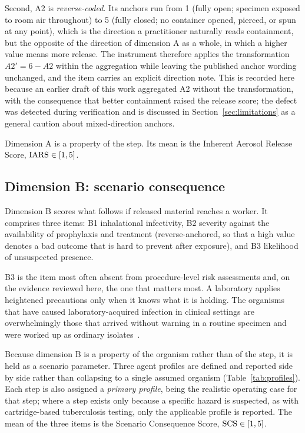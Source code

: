Second, A2 is \emph{reverse-coded}. Its anchors run from 1 (fully open; specimen exposed
to room air throughout) to 5 (fully closed; no container opened, pierced, or spun at any
point), which is the direction a practitioner naturally reads containment, but the
opposite of the direction of dimension A as a whole, in which a higher value means more
release. The instrument therefore applies the transformation $A2' = 6 - A2$ within the
aggregation while leaving the published anchor wording unchanged, and the item carries an
explicit direction note. This is recorded here because an earlier draft of this work
aggregated A2 without the transformation, with the consequence that better containment
raised the release score; the defect was detected during verification and is discussed in
Section~\ref{sec:limitations} as a general caution about mixed-direction anchors.

Dimension A is a property of the step. Its mean is the Inherent Aerosol Release Score,
$\textrm{IARS} \in [1,5]$.

\subsection{Dimension B: scenario consequence}

Dimension B scores what follows if released material reaches a worker. It comprises three
items: B1 inhalational infectivity, B2 severity against the availability of prophylaxis
and treatment (reverse-anchored, so that a high value denotes a bad outcome that is hard
to prevent after exposure), and B3 likelihood of unsuspected presence.

B3 is the item most often absent from procedure-level risk assessments and, on the
evidence reviewed here, the one that matters most. A laboratory applies heightened
precautions only when it knows what it is holding. The organisms that have caused
laboratory-acquired infection in clinical settings are overwhelmingly those that arrived
without warning in a routine specimen and were worked up as ordinary
isolates~\cite{ackelsberg2020,sejvar2005}.

Because dimension B is a property of the organism rather than of the step, it is held as a
scenario parameter. Three agent profiles are defined and reported side by side rather than
collapsing to a single assumed organism (Table~\ref{tab:profiles}). Each step is also
assigned a \emph{primary profile}, being the realistic operating case for that step; where
a step exists only because a specific hazard is suspected, as with cartridge-based
tuberculosis testing, only the applicable profile is reported. The mean of the three items
is the Scenario Consequence Score, $\textrm{SCS} \in [1,5]$.

